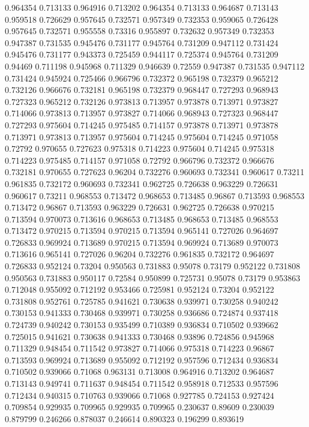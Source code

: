 0.964354 0.713133
0.964916 0.713202
0.964354 0.713133
0.964687 0.713143
0.959518 0.726629
0.957645 0.732571
0.957349 0.732353
0.959065 0.726428
0.957645 0.732571
0.955558 0.73316
0.955897 0.732632
0.957349 0.732353
0.947387 0.731535
0.945476 0.731177
0.945764 0.731209
0.947112 0.731424
0.945476 0.731177
0.943373 0.725459
0.944117 0.725374
0.945764 0.731209
0.94469 0.711198
0.945968 0.711329
0.946639 0.72559
0.947387 0.731535
0.947112 0.731424
0.945924 0.725466
0.966796 0.732372
0.965198 0.732379
0.965212 0.732126
0.966676 0.732181
0.965198 0.732379
0.968447 0.727293
0.968943 0.727323
0.965212 0.732126
0.973813 0.713957
0.973878 0.713971
0.973827 0.714066
0.973813 0.713957
0.973827 0.714066
0.968943 0.727323
0.968447 0.727293
0.975604 0.714245
0.975485 0.714157
0.973878 0.713971
0.973878 0.713971
0.973813 0.713957
0.975604 0.714245
0.975604 0.714245
0.971058 0.72792
0.970655 0.727623
0.975318 0.714223
0.975604 0.714245
0.975318 0.714223
0.975485 0.714157
0.971058 0.72792
0.966796 0.732372
0.966676 0.732181
0.970655 0.727623
0.96204 0.732276
0.960693 0.732341
0.960617 0.73211
0.961835 0.732172
0.960693 0.732341
0.962725 0.726638
0.963229 0.726631
0.960617 0.73211
0.968553 0.713472
0.968653 0.713485
0.96867 0.713593
0.968553 0.713472
0.96867 0.713593
0.963229 0.726631
0.962725 0.726638
0.970215 0.713594
0.970073 0.713616
0.968653 0.713485
0.968653 0.713485
0.968553 0.713472
0.970215 0.713594
0.970215 0.713594
0.965141 0.727026
0.964697 0.726833
0.969924 0.713689
0.970215 0.713594
0.969924 0.713689
0.970073 0.713616
0.965141 0.727026
0.96204 0.732276
0.961835 0.732172
0.964697 0.726833
0.952124 0.73204
0.950563 0.731883
0.95078 0.73179
0.952122 0.731808
0.950563 0.731883
0.950117 0.72584
0.950899 0.725731
0.95078 0.73179
0.953863 0.712048
0.955092 0.712192
0.953466 0.725981
0.952124 0.73204
0.952122 0.731808
0.952761 0.725785
0.941621 0.730638
0.939971 0.730258
0.940242 0.730153
0.941333 0.730468
0.939971 0.730258
0.936686 0.724874
0.937418 0.724739
0.940242 0.730153
0.935499 0.710389
0.936834 0.710502
0.939662 0.725015
0.941621 0.730638
0.941333 0.730468
0.93896 0.724856
0.945968 0.711329
0.948454 0.711542
0.973827 0.714066
0.975318 0.714223
0.96867 0.713593
0.969924 0.713689
0.955092 0.712192
0.957596 0.712434
0.936834 0.710502
0.939066 0.71068
0.963131 0.713008
0.964916 0.713202
0.964687 0.713143
0.949741 0.711637
0.948454 0.711542
0.958918 0.712533
0.957596 0.712434
0.940315 0.710763
0.939066 0.71068
0.927785 0.724153
0.927424 0.709854
0.929935 0.709965
0.929935 0.709965
0.230637 0.89609
0.230039 0.879799
0.246266 0.878037
0.246614 0.890323
0.196299 0.893619
